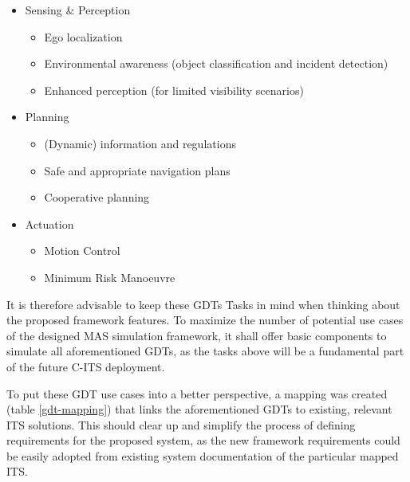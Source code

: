 \documentclass[0main.tex]{subfiles}
\begin{document}
\begin{itemize}
    \item Sensing \& Perception
    \begin{itemize}
        \item Ego localization
        \item Environmental awareness (object classification and incident detection)
        \item Enhanced perception (for limited visibility scenarios)
    \end{itemize}
    \item Planning
    \begin{itemize}
        \item (Dynamic) information and regulations
        \item Safe and appropriate navigation plans
        \item Cooperative planning
    \end{itemize}
    \item Actuation
    \begin{itemize}
        \item Motion Control
        \item Minimum Risk Manoeuvre
    \end{itemize}
\end{itemize}

It is therefore advisable to keep these GDTs Tasks in mind when thinking about the proposed framework 
features. To maximize the number of potential use cases of the designed MAS simulation framework, 
it shall offer basic components to simulate all aforementioned GDTs, as the tasks above will be
a fundamental part of the future C-ITS deployment.

To put these GDT use cases into a better perspective, a mapping was created (table
\ref{gdt-mapping}) that links the aforementioned GDTs to existing, relevant ITS solutions.
This should clear up and simplify the process of defining requirements for the proposed system,
as the new framework requirements could be easily adopted from existing system documentation of
the particular mapped ITS.
\end{document}
